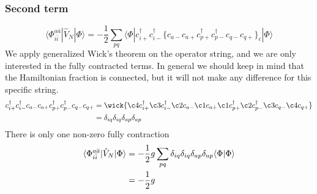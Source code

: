 \documentclass[norsk,a4paper,12pt]{article}
\begin{document}
\subsubsection*{Second term}
\begin{equation*}
\langle\Phi_{i\bar{i}}^{a\bar{a}}|\hat{V}_N|\Phi\rangle=-\frac{1}{2}\sum_{pq}\langle\Phi|c_{i+}^{\dagger}c_{i-}^{\dagger}\{c_{a-}c_{a+}c_{p+}^{\dagger}c_{p-}^{\dagger}c_{q-}c_{q+}\}_c|\Phi\rangle
\end{equation*}
We apply generalized Wick's theorem on the operator string, and we are only interested in the fully contracted terms. In general we should keep in mind that the Hamiltonian fraction is connected, but it will not make any difference for this specific string.
\begin{align*}
c_{i+}^{\dagger}c_{i-}^{\dagger}c_{a-}c_{a+}c_{p+}^{\dagger}c_{p-}^{\dagger}c_{q-}c_{q+}&=\wick{\c4 c_{i+}^{\dagger}\c3 c_{i-}^{\dagger}\c2 c_{a-}\c1 c_{a+}\c1 c_{p+}^{\dagger}\c2 c_{p-}^{\dagger}\c3 c_{q-}\c4 c_{q+}}\notag\\
&=\delta_{iq}\delta_{iq}\delta_{ap}\delta_{ap}
\end{align*}
There is only one non-zero fully contraction
\begin{align}
\langle\Phi_{i\bar{i}}^{a\bar{a}}|\hat{V}_N|\Phi\rangle&=-\frac{1}{2}g\sum_{pq}\delta_{iq}\delta_{iq}\delta_{ap}\delta_{ap}\langle\Phi|\Phi\rangle\notag\\
&=-\frac{1}{2}g
\end{align}
\end{document}
